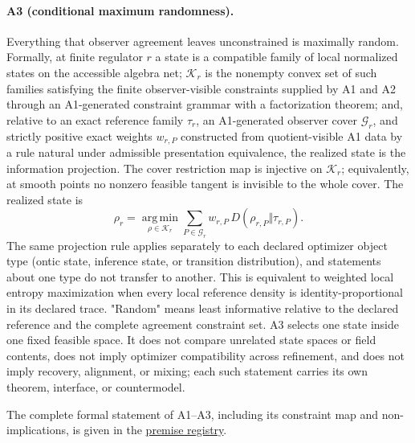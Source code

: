 \paragraph{A3 (conditional maximum randomness).}
Everything that observer agreement leaves unconstrained is maximally random.
Formally, at finite regulator \(r\) a state is a compatible family of local
normalized states on the accessible algebra net; \(\mathcal K_r\) is the
nonempty convex set of such families satisfying the finite observer-visible
constraints supplied by A1 and A2 through an A1-generated constraint
grammar with a factorization theorem; and, relative to an exact reference
family \(\tau_r\), an A1-generated observer cover \(\mathcal G_r\), and
strictly positive exact weights \(w_{r,P}\) constructed from quotient-visible
A1 data by a rule natural under admissible presentation equivalence, the
realized state is the
information projection. The cover restriction map is injective on
\(\mathcal K_r\); equivalently, at smooth points no nonzero feasible
tangent is invisible to the whole cover. The realized state is
\[
\rho_r=\operatorname*{arg\,min}_{\rho\in\mathcal K_r}
\sum_{P\in\mathcal G_r} w_{r,P}\,D(\rho_{r,P}\Vert\tau_{r,P}).
\]
The same projection rule applies separately to each declared optimizer
object type (ontic state, inference state, or transition distribution), and
statements about one type do not transfer to another.
This is equivalent to weighted local entropy maximization when every local
reference density is identity-proportional in its declared trace. "Random"
means least informative relative to the
declared reference and the complete agreement constraint set. A3
selects one state inside one fixed feasible space. It does not compare
unrelated state spaces or field contents, does not imply optimizer
compatibility across refinement, and does not imply recovery, alignment, or
mixing; each such statement carries its own theorem, interface, or
countermodel.

The complete formal statement of A1--A3, including its constraint map and
non-implications, is given in the
\href{https://github.com/FloatingPragma/observer-patch-holography/blob/r2074/claims/axiom_registry.yaml}
{premise registry}.
